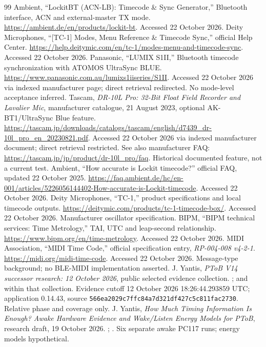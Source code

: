 \documentclass[11pt,letterpaper]{article}
\newcommand{\code}[1]{\texttt{#1}}
\begin{document}
\begin{thebibliography}{99}
 Ambient, ``LockitBT (ACN-LB): Timecode \& Sync Generator,'' Bluetooth interface, ACN and external-master TX mode. \url{https://ambient.de/en/products/lockit-bt}. Accessed 22 October 2026.
 Deity Microphones, ``[TC-1] Modes, Menu Reference \& Timecode Sync,'' official Help Center. \url{https://help.deitymic.com/en/tc-1/modes-menu-and-timecode-sync}. Accessed 22 October 2026.
 Panasonic, ``LUMIX S1II,'' Bluetooth timecode synchronization with ATOMOS UltraSync BLUE. \url{https://www.panasonic.com.au/lumixs1iiseries/S1II}. Accessed 22 October 2026 via indexed manufacturer page; direct retrieval redirected. No mode-level acceptance inferred.
 Tascam, \emph{DR-10L Pro: 32-Bit Float Field Recorder and Lavalier Mic}, manufacturer catalogue, 21 August 2023, optional AK-BT1/UltraSync Blue feature. \url{https://tascam.jp/downloads/catalogs/tascam/english/d7439_dr-10l_pro_en_20230821.pdf}. Accessed 22 October 2026 via indexed manufacturer document; direct retrieval restricted. See also manufacturer FAQ: \url{https://tascam.jp/jp/product/dr-10l_pro/faq}. Historical documented feature, not a current test.
 Ambient, ``How accurate is Lockit timecode?'' official FAQ, updated 22 October 2025. \url{https://faq.ambient.de/hc/en-001/articles/5226056144402-How-accurate-is-Lockit-timecode}. Accessed 22 October 2026.
 Deity Microphones, ``TC-1,'' product specifications and local timecode outputs. \url{https://deitymic.com/products/tc-1-timecode-box/}. Accessed 22 October 2026. Manufacturer oscillator specification.
 BIPM, ``BIPM technical services: Time Metrology,'' TAI, UTC and leap-second relationship. \url{https://www.bipm.org/en/time-metrology}. Accessed 22 October 2026.
 MIDI Association, ``MIDI Time Code,'' official specification entry, \emph{RP-004-008 v4-2-1}. \url{https://midi.org/midi-time-code}. Accessed 22 October 2026. Message-type background; no BLE-MIDI implementation asserted.
 J. Yantis, \emph{PToB V14 successor research: 12 October 2026}, public selected evidence collection. ;  and  within that collection. Evidence cutoff 12 October 2026 18:26:44.293859 UTC; application 0.14.43, source \code{566ea2029c7ffc84a7d321df427c5c811fac2730}. Relative phase and coverage only.
 J. Yantis, \emph{How Much Timing Information Is Enough? Awake Hardware Evidence and Wake/Listen Energy Models for PToB}, research draft, 19 October 2026. ; . Six separate awake PC117 runs; energy models hypothetical.
\end{thebibliography}
\end{document}
